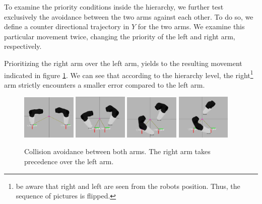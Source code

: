 To examine the priority conditions inside the hierarchy, we further test exclusively the avoidance between the two arms against each other. To do so, we define a counter directional trajectory in $Y$ for the two arms. We examine this particular movement twice, changing the priority of the left and right arm, respectively.

Prioritizing the right arm over the left arm, yields to the resulting movement indicated in figure \ref{fig:armrightoverleft}. We can see that according to the hierarchy level, the right\footnote{be aware that right and left are seen from the robots position. Thus, the sequence of pictures is flipped.} arm  strictly encounters a smaller error compared to the left arm.
\begin{figure}[h!]
  \centering
    \includegraphics[width=0.23\textwidth]{../figures/right_over_left/1.png}
    \includegraphics[width=0.23\textwidth]{../figures/right_over_left/2.png}
    \includegraphics[width=0.23\textwidth]{../figures/right_over_left/3.png}
    \includegraphics[width=0.23\textwidth]{../figures/right_over_left/4.png}
    \caption{Collision avoidance between both arms. The right arm takes precedence over the left arm.}
    \label{fig:armrightoverleft}
\end{figure}

